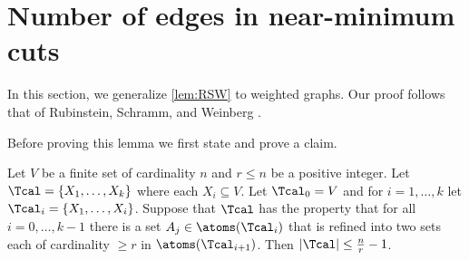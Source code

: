 
\section{Number of edges in near-minimum cuts}
In this section, we generalize \cref{lem:RSW} to weighted graphs.  Our proof follows that of Rubinstein, Schramm, and Weinberg \cite{RSW18}.

\RSWweighted*
Before proving this lemma we first state and prove a claim.
\begin{claim}
\label{clm:sizeK}
Let $V$ be a finite set of cardinality $n$ and $r \le n$ be a positive integer.  Let $\Tcal = \{X_1, \ldots, X_k\}$ where each $X_i \subseteq V$.  Let 
$\Tcal_0 = V$ and for $i = 1, \ldots, k$ let $\Tcal_i = \{X_1, \ldots, X_i\}$.  Suppose that $\Tcal$ has the property that for all $i = 0, \ldots, k-1$ 
there is a set $A_j \in \atoms(\Tcal_i)$ that is refined into two sets each of cardinality $\ge r$ in $\atoms(\Tcal_{i+1})$.  Then $|\Tcal| \le \frac{n}{r}-1$.
\end{claim}

